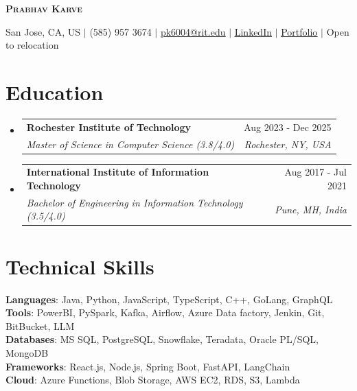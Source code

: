 \documentclass[letterpaper,10.5pt]{article}
\makeatletter
\newcommand{\resumeSubheading}[4]{
  \vspace{-2pt}\item
    \begin{tabular*}{0.97\textwidth}[t]{l@{\extracolsep{\fill}}r}
      \textbf{#1} & #2 \\
      \textit{\small#3} & \textit{\small #4} \\
    \end{tabular*}
}
\newcommand{\resumeSubHeadingListStart}{\begin{itemize}[leftmargin=0.15in, label={}]}
\newcommand{\resumeSubHeadingListEnd}{\end{itemize}}
\makeatother
\begin{document}
\begin{center}
\vspace{-20pt}
    \textbf{\Large \scshape Prabhav Karve} \\ \vspace{1pt}
    
    \small {San Jose, CA, US} $|$ (585) 957 3674 $|$ \href{mailto:pk6004@g.rit.edu}{{\underline{pk6004@rit.edu}}} $|$ 
    \href{https://www.linkedin.com/in/prabhav-karve-11300a145/}{\underline{LinkedIn}} $|$
    \href{https://prabhav-karve-portfolio2-0.vercel.app/}{\underline{Portfolio}} $|$
    {Open to relocation }
\vspace{-3pt}
\end{center}


\section{Education}
  \resumeSubHeadingListStart
    \resumeSubheading
      {Rochester Institute of Technology}{Aug 2023 - Dec 2025}
      {Master of Science in Computer Science (3.8/4.0)}{Rochester, NY, USA}
      {}
      \vspace{-5pt}
    \resumeSubheading
       {International Institute of Information Technology }{Aug 2017 - Jul 2021}
      {Bachelor of Engineering in Information Technology (3.5/4.0)}{Pune, MH, India}
      {}
  \resumeSubHeadingListEnd



\section{Technical Skills}
 \begin{itemize}[leftmargin=0.15in, label={}]
    \small{\item{
     \textbf{Languages}{: Java, Python, JavaScript, TypeScript, C++, GoLang, GraphQL} \\
     \textbf{Tools}{: PowerBI, PySpark, Kafka, Airflow, Azure Data factory, Jenkin, Git, BitBucket, LLM} \\
     \textbf{Databases}{: MS SQL, PostgreSQL, Snowflake, Teradata, Oracle PL/SQL, MongoDB}\\
     \textbf{Frameworks}{: React.js, Node.js, Spring Boot, FastAPI, LangChain } \\
     \textbf{Cloud}{: Azure Functions, Blob Storage, AWS EC2, RDS, S3, Lambda} 
    }}
 \end{itemize}
\end{document}
